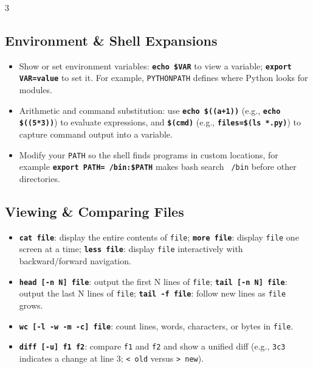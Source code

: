 \documentclass[6pt,landscape]{article}
\newcommand{\cmd}[1]{\textbf{\texttt{\textcolor{cmdcolor}{#1}}}}
\begin{document}
\begin{multicols}{3}
\subsection{Environment \& Shell Expansions}\label{sec:envshell}
\begin{itemize}
  \item Show or set environment variables: \cmd{echo \$VAR} to view a variable; \cmd{export VAR=value} to set it. For example, \texttt{PYTHONPATH} defines where Python looks for modules.
  \item Arithmetic and command substitution: use \cmd{echo \$((a+1))} (e.g., \cmd{echo \$((5*3))}) to evaluate expressions, and \cmd{\$(cmd)} (e.g., \cmd{files=\$(ls *.py)}) to capture command output into a variable.
  \item Modify your \texttt{PATH} so the shell finds programs in custom locations, for example \cmd{export PATH=~/bin:\$PATH} makes bash search \texttt{~/bin} before other directories.
\end{itemize}

\subsection{Viewing \& Comparing Files}\label{sec:viewfiles}
\begin{itemize}
  \item \cmd{cat \texttt{file}}: display the entire contents of \texttt{file}; \cmd{more \texttt{file}}: display \texttt{file} one screen at a time; \cmd{less \texttt{file}}: display \texttt{file} interactively with backward/forward navigation.
  \item \cmd{head [-n N] \texttt{file}}: output the first N lines of \texttt{file}; \cmd{tail [-n N] \texttt{file}}: output the last N lines of \texttt{file}; \cmd{tail -f \texttt{file}}: follow new lines as \texttt{file} grows.
  \item \cmd{wc [-l -w -m -c] \texttt{file}}: count lines, words, characters, or bytes in \texttt{file}.
  \item \cmd{diff [-u] \texttt{f1} \texttt{f2}}: compare \texttt{f1} and \texttt{f2} and show a unified diff (e.g., \texttt{3c3} indicates a change at line 3; \texttt{< old} versus \texttt{> new}).
\end{itemize}



\end{multicols}
\end{document}
